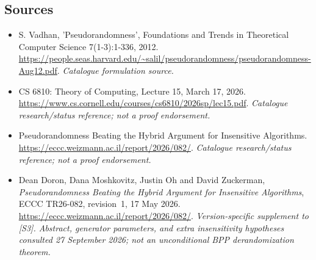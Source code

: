 \documentclass[11pt,a4paper]{article}
\numberwithin{equation}{section}
\begin{document}
\subsection{Sources}
\begin{itemize}\raggedright
\item[\textnormal{[S1]}]\hypertarget{source:27:1}{} S. Vadhan, 'Pseudorandomness', Foundations and Trends in Theoretical Computer Science 7(1-3):1-336, 2012.
\url{https://people.seas.harvard.edu/~salil/pseudorandomness/pseudorandomness-Aug12.pdf}.
{\small\textit{Catalogue formulation source.}}
\item[\textnormal{[S2]}]\hypertarget{source:27:2}{} CS 6810: Theory of Computing, Lecture 15, March 17, 2026.
\url{https://www.cs.cornell.edu/courses/cs6810/2026sp/lec15.pdf}.
{\small\textit{Catalogue research/status reference; not a proof endorsement.}}
\item[\textnormal{[S3]}]\hypertarget{source:27:3}{} Pseudorandomness Beating the Hybrid Argument for Insensitive Algorithms.
\url{https://eccc.weizmann.ac.il/report/2026/082/}.
{\small\textit{Catalogue research/status reference; not a proof endorsement.}}
\item[\textnormal{[E1]}]\hypertarget{extra:27:1}{} Dean Doron, Dana Moshkovitz,
Justin Oh and David Zuckerman, \emph{Pseudorandomness Beating the Hybrid
Argument for Insensitive Algorithms}, ECCC TR26-082, revision~1,
17 May 2026.
\url{https://eccc.weizmann.ac.il/report/2026/082/}.
{\small\textit{Version-specific supplement to [S3]. Abstract, generator
parameters, and extra insensitivity hypotheses consulted 27 September 2026;
not an unconditional BPP derandomization theorem.}}

\end{itemize}

\end{document}
